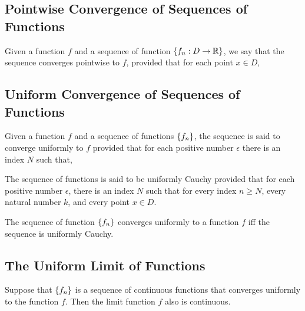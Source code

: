     \subsection{Pointwise Convergence of Sequences of Functions}

    \begin{definition}
        Given a function $f$ and a sequence of function ${\left\{ f_n:D\to\mathbb{R} \right\}}$, we say that the sequence converges
        pointwise to $f$, provided that for each point $x \in D$,
    \end{definition}  %

    \subsection{Uniform Convergence of Sequences of Functions}

    \begin{definition}
        Given a function $f$ and a sequence of functions ${\left\{ f_n \right\}}$, the sequence is said to converge uniformly to $f$
        provided that for each positive number $\epsilon$ there is an index $N$ such that,
    \end{definition}

    \begin{definition}
        The sequence of functions is said to be uniformly Cauchy provided that for each positive number $\epsilon$,
        there is an index $N$ such that
        for every index $n \ge N$, every natural number $k$, and every point $x\in D$.
    \end{definition}

    \begin{thm}
        The sequence of function ${\left\{ f_n \right\}}$ converges uniformly to a function $f$ iff the sequence is uniformly
        Cauchy.
    \end{thm}

    \subsection{The Uniform Limit of Functions}

    \begin{thm}
        Suppose that ${\left\{ f_n \right\}}$ is a sequence of continuous functions that converges uniformly to the function $f$.
        Then the limit function $f$ also is continuous.
    \end{thm}

